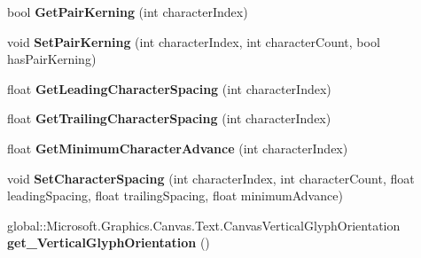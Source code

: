 \begin{DoxyCompactItemize}
\mbox{\label{class_microsoft_1_1_graphics_1_1_canvas_1_1_text_1_1_canvas_text_layout_add821cfda40c6e413e94792d52f961f5}} 
bool {\bfseries Get\+Pair\+Kerning} (int character\+Index)
\item 
\mbox{\label{class_microsoft_1_1_graphics_1_1_canvas_1_1_text_1_1_canvas_text_layout_ac079598c499d635ad51a5e304c41da93}} 
void {\bfseries Set\+Pair\+Kerning} (int character\+Index, int character\+Count, bool has\+Pair\+Kerning)
\item 
\mbox{\label{class_microsoft_1_1_graphics_1_1_canvas_1_1_text_1_1_canvas_text_layout_a65d05d925378e8e2514390271630066c}} 
float {\bfseries Get\+Leading\+Character\+Spacing} (int character\+Index)
\item 
\mbox{\label{class_microsoft_1_1_graphics_1_1_canvas_1_1_text_1_1_canvas_text_layout_a70acd1bd088fdd6ab75e719f500f7d5c}} 
float {\bfseries Get\+Trailing\+Character\+Spacing} (int character\+Index)
\item 
\mbox{\label{class_microsoft_1_1_graphics_1_1_canvas_1_1_text_1_1_canvas_text_layout_ae70042fca13d7c261dea65b89cbbae5d}} 
float {\bfseries Get\+Minimum\+Character\+Advance} (int character\+Index)
\item 
\mbox{\label{class_microsoft_1_1_graphics_1_1_canvas_1_1_text_1_1_canvas_text_layout_a738825e42cca183687361df02597990c}} 
void {\bfseries Set\+Character\+Spacing} (int character\+Index, int character\+Count, float leading\+Spacing, float trailing\+Spacing, float minimum\+Advance)
\item 
\mbox{\label{class_microsoft_1_1_graphics_1_1_canvas_1_1_text_1_1_canvas_text_layout_afd275d5017f0ed4abf5747b6611ba137}} 
global\+::\+Microsoft.\+Graphics.\+Canvas.\+Text.\+Canvas\+Vertical\+Glyph\+Orientation {\bfseries get\+\_\+\+Vertical\+Glyph\+Orientation} ()

\end{DoxyCompactItemize}

